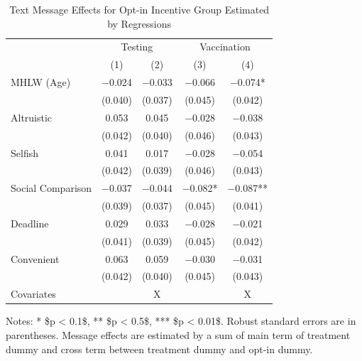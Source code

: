 \documentclass[
]{article}
\begin{document}
\begin{table}

\caption{\label{tab:lh-int}Text Message Effects for Opt-in Incentive Group Estimated by Regressions}
\centering
\fontsize{9}{11}\selectfont
\begin{threeparttable}
\begin{tabular}[t]{lcccc}
\toprule
\multicolumn{1}{c}{ } & \multicolumn{2}{c}{Testing} & \multicolumn{2}{c}{Vaccination} \\
\cmidrule(l{3pt}r{3pt}){2-3} \cmidrule(l{3pt}r{3pt}){4-5}
  & (1) & (2) & (3) & (4)\\
\midrule
MHLW (Age) & \num{-0.024} & \num{-0.033} & \num{-0.066} & \num{-0.074}*\\
 & (\num{0.040}) & (\num{0.037}) & (\num{0.045}) & (\num{0.042})\\
Altruistic & \num{0.053} & \num{0.045} & \num{-0.028} & \num{-0.038}\\
 & (\num{0.042}) & (\num{0.040}) & (\num{0.046}) & (\num{0.043})\\
Selfish & \num{0.041} & \num{0.017} & \num{-0.028} & \num{-0.054}\\
 & (\num{0.042}) & (\num{0.039}) & (\num{0.046}) & (\num{0.043})\\
Social Comparison & \num{-0.037} & \num{-0.044} & \num{-0.082}* & \num{-0.087}**\\
 & (\num{0.039}) & (\num{0.037}) & (\num{0.045}) & (\num{0.041})\\
Deadline & \num{0.029} & \num{0.033} & \num{-0.028} & \num{-0.021}\\
 & (\num{0.041}) & (\num{0.039}) & (\num{0.045}) & (\num{0.042})\\
Convenient & \num{0.063} & \num{0.059} & \num{-0.030} & \num{-0.031}\\
 & (\num{0.042}) & (\num{0.040}) & (\num{0.045}) & (\num{0.043})\\
Covariates &  & X &  & X\\
\bottomrule
\end{tabular}
\begin{tablenotes}
\item Notes: * \$p < 0.1\$, ** \$p < 0.5\$, *** \$p < 0.01\$. Robust standard errors are in parentheses. Message effects are estimated by a sum of main term of treatment dummy and cross term between treatment dummy and opt-in dummy.
\end{tablenotes}
\end{threeparttable}
\end{table}
\end{document}
